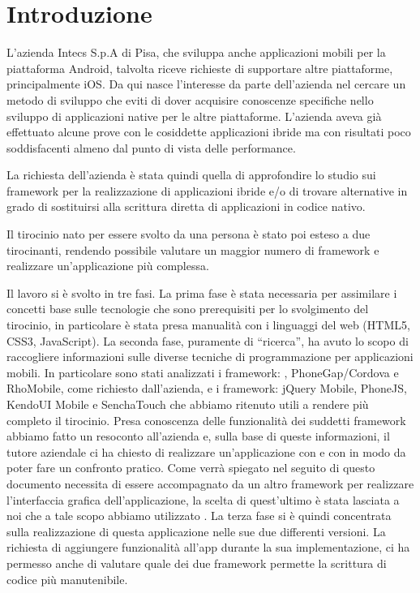 \setcounter{page}{1}

\chapter{Introduzione}
    L'azienda Intecs S.p.A di Pisa, che sviluppa anche applicazioni mobili per la
    piattaforma Android, talvolta riceve richieste di supportare altre piattaforme,
    principalmente iOS. Da qui nasce l'interesse da parte dell'azienda nel
    cercare un metodo di sviluppo \crossplat{} che eviti di dover acquisire
    conoscenze specifiche nello sviluppo di applicazioni native per le altre
    piattaforme. L'azienda aveva già effettuato alcune prove con le cosiddette
    applicazioni ibride ma con risultati poco soddisfacenti almeno dal punto di
    vista delle performance.

    La richiesta dell'azienda è stata quindi quella di approfondire lo studio sui
    framework per la realizzazione di applicazioni ibride e/o di trovare alternative
    in grado di sostituirsi alla scrittura diretta di applicazioni in codice
    nativo.

    Il tirocinio nato per essere svolto da una persona è stato poi esteso a due
    tirocinanti, rendendo possibile valutare un maggior numero di framework e
    realizzare un'applicazione più complessa.

    Il lavoro si è svolto in tre fasi. La prima fase è stata necessaria per
    assimilare i concetti base sulle tecnologie che sono prerequisiti per lo
    svolgimento del tirocinio, in particolare è stata presa manualità con i
    linguaggi del web (HTML5, CSS3, JavaScript). La seconda fase, puramente di
    ``ricerca'', ha avuto lo scopo di raccogliere informazioni sulle diverse
    tecniche di programmazione per applicazioni mobili. In particolare sono
    stati analizzati i framework: \tisdk{},
    PhoneGap/Cordova e RhoMobile, come richiesto dall'azienda, e i framework:
    jQuery Mobile, PhoneJS, KendoUI Mobile e SenchaTouch che abbiamo ritenuto
    utili a rendere più completo il tirocinio.
    Presa conoscenza delle funzionalità dei suddetti framework abbiamo fatto un
    resoconto all'azienda e, sulla base di queste informazioni, il tutore
    aziendale ci ha chiesto di realizzare un'applicazione con \pg{} e con
    \tisdk{} in modo da poter fare un confronto pratico. Come verrà spiegato
    nel seguito di questo documento \pg{} necessita di essere accompagnato da
    un altro framework per realizzare l'interfaccia grafica
    dell'applicazione, la scelta di quest'ultimo è stata lasciata a noi che
    a tale scopo abbiamo utilizzato \kendomob{}.
    La terza fase si è quindi concentrata sulla realizzazione di questa
    applicazione nelle sue due differenti versioni. La richiesta di aggiungere
    funzionalità all'app durante la sua implementazione, ci ha permesso anche di
    valutare quale dei due framework permette la scrittura di codice più
    manutenibile.

